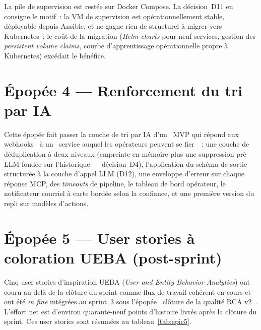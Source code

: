 \documentclass[11pt,a4paper,oneside]{report}
\begin{document}
La pile de supervision est restée sur Docker Compose. La
décision~D11 en consigne le motif~: la VM de supervision est
opérationnellement stable, déployable depuis Ansible, et ne gagne
rien de structurel à migrer vers Kubernetes~; le coût de la
migration (\emph{Helm charts} pour neuf services, gestion des
\emph{persistent volume claims}, courbe d'apprentissage
opérationnelle propre à Kubernetes) excédait le bénéfice.

\section{Épopée 4 --- Renforcement du tri par IA}

Cette épopée fait passer la couche de tri par IA d'un
\og~MVP qui répond aux webhooks~\fg{} à un \og~service auquel les
opérateurs peuvent se fier~\fg{}~: une couche de déduplication à
deux niveaux (empreinte en mémoire plus une suppression pré-LLM
fondée sur l'historique --- décision~D4), l'application du schéma
de sortie structurée à la couche d'appel LLM (D12), une enveloppe
d'erreur sur chaque réponse MCP, des \emph{timeouts} de pipeline, le
tableau de bord opérateur, le notificateur courriel à carte bordée
selon la confiance, et une première version du repli sur modèles
d'actions.

\section{Épopée 5 --- User stories à coloration UEBA (post-sprint)}

Cinq user stories d'inspiration UEBA (\emph{User and Entity Behavior
Analytics}) ont couru au-delà de la clôture du sprint comme flux de
travail cohérent en cours et ont été \emph{in fine} intégrées au
sprint~3 sous l'épopée \og~clôture de la qualité RCA v2~\fg{}.
L'effort net est d'environ quarante-neuf points d'histoire livrés
après la clôture du sprint. Ces user stories sont résumées au
tableau~\ref{tab:epic5}.
\end{document}
